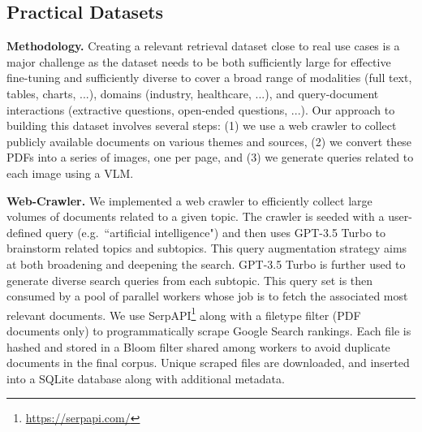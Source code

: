 \documentclass{article} %
\begin{document}
\label{subsection:tabfquad}


\subsection{Practical Datasets}
\label{subsection:docvisbench_methodology}


\noindent\textbf{Methodology.} Creating a relevant retrieval dataset close to real use cases is a major challenge as the dataset needs to be both sufficiently large for effective fine-tuning and sufficiently diverse to cover a broad range of modalities (full text, tables, charts, ...), domains (industry, healthcare, ...), and query-document interactions (extractive questions, open-ended questions, ...). Our approach to building this dataset involves several steps: (1) we use a web crawler to collect publicly available documents on various themes and sources, (2) we convert these PDFs into a series of images, one per page, and (3) we generate queries related to each image using a VLM.

\noindent\textbf{Web-Crawler.} We implemented a web crawler to efficiently collect large volumes of documents related to a given topic. The crawler is seeded with a user-defined query (e.g.\ ``artificial intelligence") and then uses GPT-3.5 Turbo to brainstorm related topics and subtopics. This query augmentation strategy aims at both broadening and deepening the search. GPT-3.5 Turbo is further used to generate diverse search queries from each subtopic. This query set is then consumed by a pool of parallel workers whose job is to fetch the associated most relevant documents. We use SerpAPI\footnote{\url{https://serpapi.com/}} along with a filetype filter (PDF documents only) to programmatically scrape Google Search rankings. Each file is hashed and stored in a Bloom filter \citep{bloom_spacetime_1970} shared among workers to avoid duplicate documents in the final corpus. Unique scraped files are downloaded, and inserted into a SQLite database along with additional metadata.
\end{document}
